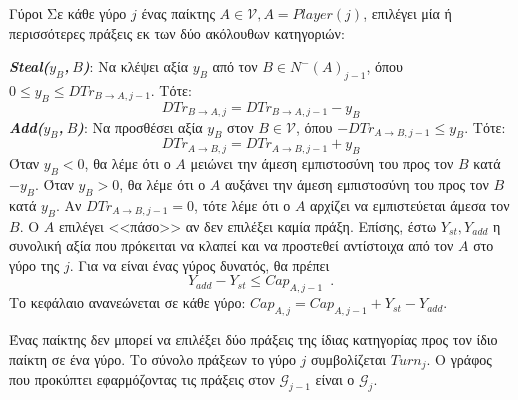 {}
\begin{definitiongr}{Γύροι}
  Σε κάθε γύρο $j$ ένας παίκτης $A \in \mathcal{V}, A = Player\left(j\right)$, επιλέγει μία ή περισσότερες πράξεις εκ των δύο
  ακόλουθων κατηγοριών:

  \noindent \textit{\textbf{\textlatin{Steal}($y_B$,$\:B$)}}: Να κλέψει αξία $y_B$ από τον $B \in N^{-}\left(A\right)_{j-1}$,
  όπου $0 \leq y_B \leq DTr_{B \rightarrow A, j-1}$. Τότε:
  \begin{equation*}
     DTr_{B \rightarrow A, j} = DTr_{B \rightarrow A, j-1} - y_B
  \end{equation*}
  \noindent \textit{\textbf{\textlatin{Add}($y_B$,$\:B$)}}: Να προσθέσει αξία $y_B$ στον $B \in \mathcal{V}$, όπου
  $-DTr_{A \rightarrow B, j-1} \leq y_B$. Τότε:
  \begin{equation*}
     DTr_{A \rightarrow B, j} = DTr_{A \rightarrow B, j-1} + y_B
  \end{equation*}
  Όταν $y_B < 0$, θα λέμε ότι ο $A$ μειώνει την άμεση εμπιστοσύνη του προς τον $B$ κατά $-y_B$. Όταν $y_B > 0$, θα λέμε ότι ο
  $A$ αυξάνει την άμεση εμπιστοσύνη του προς τον $B$ κατά $y_B$. Αν $DTr_{A \rightarrow B, j-1} = 0$, τότε λέμε ότι ο $A$
  αρχίζει να εμπιστεύεται άμεσα τον $B$. Ο $A$ επιλέγει <<πάσο>> αν δεν επιλέξει καμία πράξη. Επίσης, έστω $Y_{st}, Y_{add}$ η
  συνολική αξία που πρόκειται να κλαπεί και να προστεθεί αντίστοιχα από τον $A$ στο γύρο της $j$. Για να είναι ένας γύρος
  δυνατός, θα πρέπει
  \begin{equation}
     Y_{add} - Y_{st} \leq Cap_{A, j-1} \enspace.
  \end{equation}
  Το κεφάλαιο ανανεώνεται σε κάθε γύρο: $Cap_{A, j} = Cap_{A, j-1} + Y_{st} - Y_{add}$.

  Ένας παίκτης δεν μπορεί να επιλέξει δύο πράξεις της ίδιας κατηγορίας προς τον ίδιο παίκτη σε ένα γύρο. Το σύνολο πράξεων
  το γύρο $j$ συμβολίζεται $Turn_j$. Ο γράφος που προκύπτει εφαρμόζοντας τις πράξεις στον $\mathcal{G}_{j-1}$ είναι ο
  $\mathcal{G}_j$.
\end{definitiongr}
